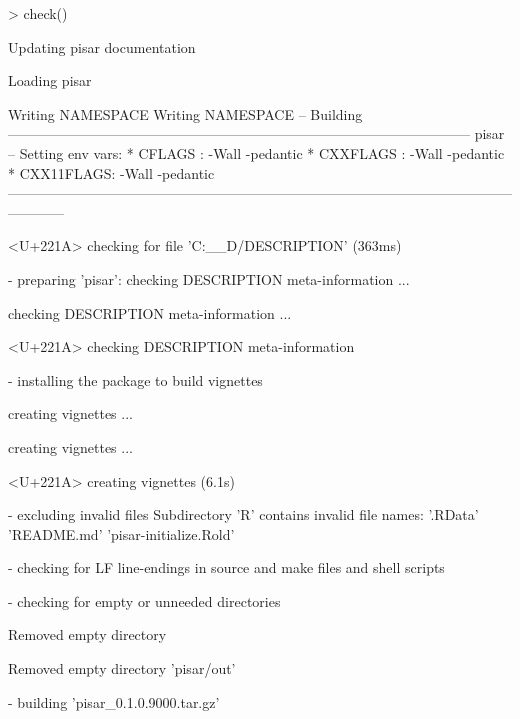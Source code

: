 \documentclass[a4paper,12pt]{article}\usepackage[]{graphicx}\usepackage[]{color}
\begin{document}
\begin{Schunk}
\begin{Sinput}
> check()
\end{Sinput}
\begin{Soutput}
Updating pisar documentation
\end{Soutput}
\begin{Soutput}
Loading pisar
\end{Soutput}
\begin{Soutput}
Writing NAMESPACE
Writing NAMESPACE
-- Building --------------------------------------------------------------------------------------------------- pisar --
Setting env vars:
* CFLAGS    : -Wall -pedantic
* CXXFLAGS  : -Wall -pedantic
* CXX11FLAGS: -Wall -pedantic
------------------------------------------------------------------------------------------------------------------------
  
  
  
<U+221A>  checking for file 'C:\__D\OMIKE\pisar/DESCRIPTION' (363ms)

  
  
  
-  preparing 'pisar':
   checking DESCRIPTION meta-information ...
  
   checking DESCRIPTION meta-information ... 
  
<U+221A>  checking DESCRIPTION meta-information

  
  
  
-  installing the package to build vignettes

  
  
  
   creating vignettes ...
  
   creating vignettes ... 
  
<U+221A>  creating vignettes (6.1s)

  
  
  
-  excluding invalid files
   Subdirectory 'R' contains invalid file names:
     '.RData' 'README.md' 'pisar-initialize.Rold'

  
  
  
-  checking for LF line-endings in source and make files and shell scripts

  
  
  
-  checking for empty or unneeded directories

  
Removed empty directory 
  
   Removed empty directory 'pisar/out'

  
  
  
-  building 'pisar_0.1.0.9000.tar.gz'


\end{Soutput}
\end{Schunk}
\end{document}
